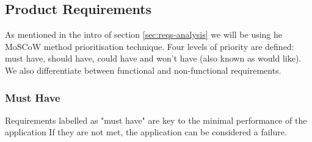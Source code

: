 \subsection{Product Requirements}\label{sec:reqs}
As mentioned in the intro of section \ref{sec:reqs-analysis} we will be using he MoSCoW method prioritisation technique. Four levels of priority are defined: must have, should have, could have and won't have (also known as would like). We also differentiate between functional and non-functional requirements. 

\subsubsection {Must Have}
Requirements labelled as "must have" are key to the minimal performance of the application If they are not met, the application can be considered a failure.

